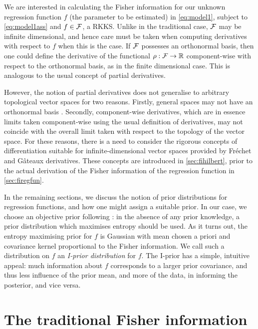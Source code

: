 \documentclass[showframe,11pt,twoside,openright]{report}
\begin{document}
\label{chapter3}

\newcommand{\funder}{\rho}  %

We are interested in calculating the Fisher information for our unknown regression function $f$ (the parameter to be estimated) in \cref{eq:model1}, subject to \cref{eq:model1ass} and $f\in{\mathcal F}$, a RKKS.
Unlike in the traditional case, ${\mathcal F}$ may be infinite dimensional, and hence care must be taken when computing derivatives with respect to $f$ when this is the case.
If ${\mathcal F}$ possesses an orthonormal basis, then one could define the derivative of the functional $\funder:\cF\to\bbR$ component-wise with respect to the orthonormal basis, as in the finite dimensional case.
This is analogous to the usual concept of   partial derivatives.

However, the notion of partial derivatives does not generalise to arbitrary topological vector spaces for two reasons.
Firstly, general spaces may not have an orthonormal basis \citep[sec. 5, p. 76]{tapia1971diff}.
Secondly, component-wise derivatives, which are in essence limits taken component-wise using the usual definition of derivatives, may not coincide with the overall limit taken with respect to the topology of the vector space.
For these reasons, there is a need to consider the rigorous concepts of differentiation suitable for infinite-dimensional vector spaces provided by Fréchet and Gâteaux derivatives.
These concepts are introduced in \cref{sec:fihilbert}, prior to the actual derivation of the Fisher information of the regression function in \cref{sec:firegfun}.

In the remaining sections, we discuss the notion of prior distributions for regression functions, and how one might assign a suitable prior.
In our case, we choose an objective prior following \citep{jaynes1957a,jaynes1957b,jaynes2003probability}: in the absence of any prior knowledge, a prior distribution which maximises entropy should be used.
As it turns out, the entropy maximising prior for $f$ is Gaussian with mean chosen a priori and covariance kernel proportional to the Fisher information.
We call such a distribution on $f$ an \emph{I-prior distribution} for $f$.
The I-prior has a simple, intuitive appeal: much information about $f$ corresponds to a larger prior covariance, and thus less influence of the prior mean, and more of the data, in informing the posterior, and vice versa.

\section{The traditional Fisher information}

\end{document}
